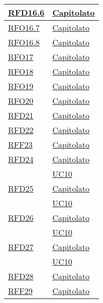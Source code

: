 \begin{longtable}{|>{\centering}m{5cm}|m{5cm}<{\centering}|}
\hyperlink{RFD16.6}{RFD16.6} & \hyperlink{Capitolato}{Capitolato}\\ \hline

\hyperlink{RFO16.7}{RFO16.7} & \hyperlink{Capitolato}{Capitolato}\\ \hline

\hyperlink{RFO16.8}{RFO16.8} & \hyperlink{Capitolato}{Capitolato}\\ \hline

\hyperlink{RFO17}{RFO17} & \hyperlink{Capitolato}{Capitolato}\\ \hline

\hyperlink{RFO18}{RFO18} & \hyperlink{Capitolato}{Capitolato}\\ \hline

\hyperlink{RFO19}{RFO19} & \hyperlink{Capitolato}{Capitolato}\\ \hline

\hyperlink{RFO20}{RFO20} & \hyperlink{Capitolato}{Capitolato}\\ \hline

\hyperlink{RFD21}{RFD21} & \hyperlink{Capitolato}{Capitolato}\\ \hline

\hyperlink{RFD22}{RFD22} & \hyperlink{Capitolato}{Capitolato}\\ \hline

\hyperlink{RFF23}{RFF23} & \hyperlink{Capitolato}{Capitolato}\\ \hline

\hyperlink{RFD24}{RFD24} & \hyperlink{Capitolato}{Capitolato}\\
& \hyperref[UC10]{UC10}\\ \hline

\hyperlink{RFD25}{RFD25} & \hyperlink{Capitolato}{Capitolato}\\
& \hyperref[UC10]{UC10}\\ \hline

\hyperlink{RFD26}{RFD26} & \hyperlink{Capitolato}{Capitolato}\\
& \hyperref[UC10]{UC10}\\ \hline

\hyperlink{RFD27}{RFD27} & \hyperlink{Capitolato}{Capitolato}\\
& \hyperref[UC10]{UC10}\\ \hline

\hyperlink{RFD28}{RFD28} & \hyperlink{Capitolato}{Capitolato}\\ \hline

\hyperlink{RFF29}{RFF29} & \hyperlink{Capitolato}{Capitolato}\\ \hline


\end{longtable}
